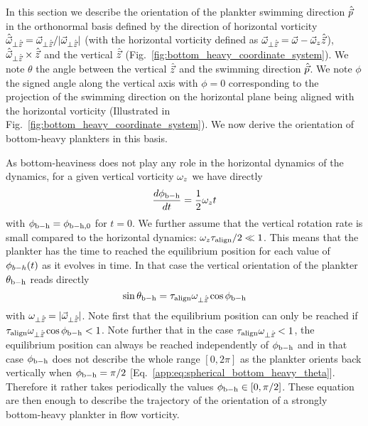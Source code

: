 In this section we describe the orientation of the plankter swimming direction $\hat{\vec{p}}$ in the orthonormal basis defined by the direction of horizontal vorticity $\hat{\vec{\omega}}_{\perp \hat{\vec{z}}} = \vec{\omega}_{\perp \hat{\vec{z}}} / \lvert\vec{\omega}_{\perp \hat{\vec{z}}}\rvert$ (with the horizontal vorticity defined as $\vec{\omega}_{\perp \hat{\vec{z}}} = \vec{\omega} - \vec{\omega}_z \hat{\vec{z}}$), $\hat{\vec{\omega}}_{\perp \hat{\vec{z}}} \times \hat{\vec{z}}$ and the vertical $\hat{\vec{z}}$ (Fig.~\ref{fig:bottom_heavy_coordinate_system}).
We note $\theta$ the angle between the vertical $\hat{\vec{z}}$ and the swimming direction $\hat{\vec{p}}$.
We note $\phi$ the signed angle along the vertical axis with $\phi = 0$ corresponding to the projection of the swimming direction on the horizontal plane being aligned with the horizontal vorticity (Illustrated in Fig.~\ref{fig:bottom_heavy_coordinate_system}).
We now derive the orientation of bottom-heavy plankters in this basis.

As bottom-heaviness does not play any role in the horizontal dynamics of the dynamics, for a given vertical vorticity $\omega_{z}$ we have directly
\begin{equation}\label{app:eq:spherical_bottom_phi}
	\frac{d \phi_{\mathrm{b-h}} }{dt} = \frac{1}{2} \omega_{z} t
\end{equation}
with $\phi_{\mathrm{b-h}} = \phi_{\mathrm{b-h}, 0}$ for $t = 0$.
We further assume that the vertical rotation rate is small compared to the horizontal dynamics: $\omega_{z} \tau_{\mathrm{align}} / 2 \ll 1$.
This means that the plankter has the time to reached the equilibrium position for each value of $\phi_{b-h}(t)$ as it evolves in time.
In that case the vertical orientation of the plankter $\theta_{\mathrm{b-h}}$ reads directly
\begin{equation}\label{app:eq:spherical_bottom_heavy_theta}
	\sin \theta_{\mathrm{b-h}} = \tau_{\mathrm{align}} \omega_{\perp \hat{\vec{z}}} \cos \phi_{\mathrm{b-h}}
\end{equation}
with $\omega_{\perp \hat{\vec{z}}} = \lvert\vec{\omega}_{\perp \hat{\vec{z}}}\rvert$.
Note first that the equilibrium position can only be reached if $\tau_{\mathrm{align}} \omega_{\perp \hat{\vec{z}}} \cos \phi_{\mathrm{b-h}} < 1$.
Note further that in the case $\tau_{\mathrm{align}} \omega_{\perp \hat{\vec{z}}} < 1$, the equilibrium position can always be reached independently of $\phi_{\mathrm{b-h}}$ and in that case $\phi_{\mathrm{b-h}}$ does not describe the whole range $[0, 2\pi]$ as the plankter orients back vertically when $\phi_{\mathrm{b-h}} = \pi/2$ [Eq.~\eqref{app:eq:spherical_bottom_heavy_theta}].
Therefore it rather takes periodically the values $\phi_{\mathrm{b-h}} \in [0, \pi/2]$.
These equation are then enough to describe the trajectory of the orientation of a strongly bottom-heavy plankter in flow vorticity.

